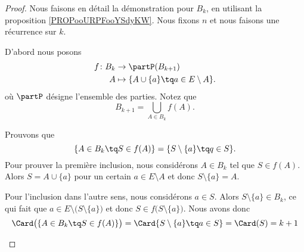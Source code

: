 \begin{proof}
	Nous faisons en détail la démonstration pour \( B_k\), en utilisant la proposition \ref{PROPooURPFooYSdyKW}. Nous fixons \( n\) et nous faisons une récurrence sur \( k\).
	\begin{subproof}
		\spitem[Le partitionnement de \( B_{k+1}\)]
		D'abord nous posons
		\begin{equation}
			\begin{aligned}
				f\colon B_k & \to \partP(B_{k+1})                              \\
				A           & \mapsto \{ A\cup\{ a \}\tq a\in E\setminus A \}.
			\end{aligned}
		\end{equation}
		où \( \partP\) désigne l'ensemble des parties. Notez que
		\begin{equation}
			B_{k+1}=\bigcup_{A\in B_k}f(A).
		\end{equation}

		Prouvons que
		\begin{equation}
			\{ A\in B_k\tq S\in f(A) \}= \{ S\setminus\{ a \}\tq q\in S \}.
		\end{equation}
		Pour prouver la première inclusion, nous considérons \( A\in B_k\) tel que \( S\in f(A)\). Alors \( S=A\cup\{ a \}\) pour un certain \( a\in E\setminus A\) et donc \( S\setminus\{ a \}=A\).

		Pour l'inclusion dans l'autre sens, nous considérons \( a\in S\). Alors \( S\setminus\{ a \}\in B_k\), ce qui fait que \( a\in E\setminus\big( S\setminus\{ a \} \big)\) et donc \( S\in f\big( S\setminus\{ a \} \big)\).
		Nous avons donc
		\begin{equation}
			\Card\big( \{ A\in B_k\tq S\in f(A) \} \big)=\Card\{ S\setminus\{ a \}\tq a\in S \}=\Card(S)=k+1
		\end{equation}


\end{subproof}
\end{proof}
